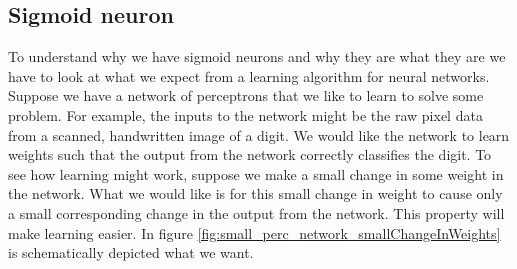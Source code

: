 \subsection{Sigmoid neuron}
To understand why we have sigmoid neurons and why they are what they are we have to look at what we expect from a learning algorithm for neural networks. Suppose we have a network of perceptrons that we like to learn to solve some problem. For example, the inputs to the network might be the raw pixel data from a scanned, handwritten image of a digit. We would like the network to learn weights such that the output from the network correctly classifies the digit. To see how learning might work, suppose we make a small change in some weight in the network. What we would like is for this small change in weight to cause only a small corresponding change in the output from the network. This property will make learning easier. In figure \ref{fig:small_perc_network_smallChangeInWeights} is schematically depicted what we want.

